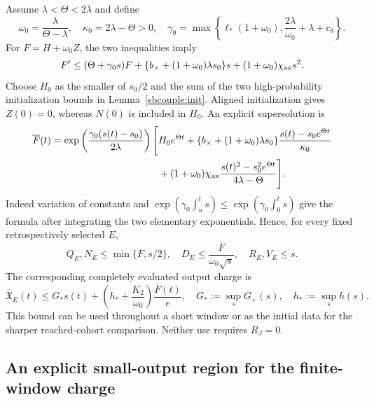 \documentclass{article} %
\theoremstyle{plain}
\theoremstyle{definition}
\theoremstyle{remark}
\begin{document}
Assume $\lambda<\Theta<2\lambda$ and define
\[
 \omega_0=\frac\lambda{\Theta-\lambda},\quad
 \kappa_0=2\lambda-\Theta>0,\quad
 \gamma_0=\max\left\{\ell_*(1+\omega_0),
                \frac{2\lambda}{\omega_0}+\lambda+c_\delta\right\}.
\]
For $F=H+\omega_0Z$, the two inequalities imply
\[
 F'\le(\Theta+\gamma_0s)F+
       \{b_\times+(1+\omega_0)\lambda s_0\}s
       +(1+\omega_0)\chi_{\rm ax}s^2.
\]
Choose $H_0$ as the smaller of $s_0/2$ and the sum of the two
high-probability initialization bounds in Lemma~\ref{sbcouple:init}.
Aligned initialization gives $Z(0)=0$, whereas $N(0)$ is included in $H_0$.
An explicit supersolution is
\begin{align}
 \overline F(t)=\exp\left(\frac{\gamma_0(s(t)-s_0)}{2\lambda}\right)
 \Bigg[&H_0e^{\Theta t}
 +\{b_\times+(1+\omega_0)\lambda s_0\}
             \frac{s(t)-s_0e^{\Theta t}}{\kappa_0}\notag\\
 &+(1+\omega_0)\chi_{\rm ax}
             \frac{s(t)^2-s_0^2e^{\Theta t}}{4\lambda-\Theta}\Bigg].
 \label{sbwindow:closed-envelope}
\end{align}
Indeed variation of constants and
$\exp(\gamma_0\int_u^t s)\le\exp(\gamma_0\int_0^t s)$ give the
formula after integrating the two elementary exponentials. Hence,
for every fixed retrospectively selected $E$,
\begin{equation}\label{sbwindow:subset-envelope}
 Q_E,N_E\le\min\{\overline F,s/2\},\quad
 D_E\le\frac{\overline F}{\omega_0\sqrt{s}},\quad
 R_E,V_E\le s.
\end{equation}
The corresponding completely evaluated output charge is
\begin{equation}\label{sbwindow:charge}
 \overline{\mathfrak X}_E(t)
 \le G_*s(t)+\left(h_*+\frac{K_2}{\omega_0}\right)
                         \frac{\overline F(t)}e,
 \quad G_*:=\sup_sG_+(s),\quad h_*:=\sup_s h(s).
\end{equation}
This bound can be used throughout a short window or as the initial data
for the sharper reached-cohort comparison. Neither use requires $R_J=0$.

\subsection{An explicit small-output region for the finite-window charge}
\end{document}
